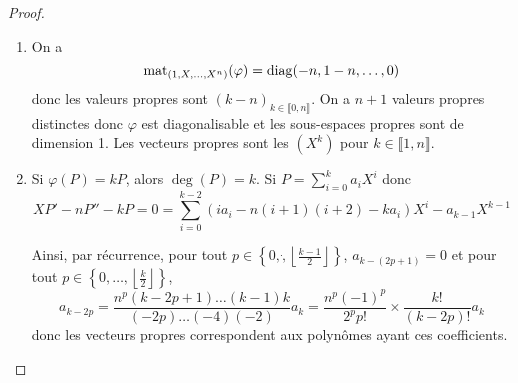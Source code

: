 \documentclass[12pt]{article}
\begin{document}
\begin{proof}
	\phantom{}
	\begin{enumerate}
		\item On a 
		\begin{equation}
			\operatorname{mat}_{(1,X,\dots,X^{n})}(\varphi)=\operatorname{diag}(-n,1-n,\dots,0)
		\end{equation}
		donc les valeurs propres sont $(k-n)_{k\in\llbracket0,n\rrbracket}$. On a $n+1$ valeurs propres distinctes donc $\varphi$ est diagonalisable et les sous-espaces propres sont de dimension 1. Les vecteurs propres sont les $(X^{k})$ pour $k\in\llbracket1,n\rrbracket$.

		\item Si $\varphi(P)=kP$, alors $\deg(P)=k$. Si $P=\sum_{i=0}^{k}a_{i}X^{i}$ donc 
		\begin{equation}
			XP'-nP''-kP=0=\sum_{i=0}^{k-2}\left(ia_{i}-n(i+1)(i+2)-ka_{i}\right)X^{i}-a_{k-1}X^{k-1}
		\end{equation}

		Ainsi, par récurrence, pour tout $p\in\left\lbrace0,\dot,\left\lfloor\frac{k-1}{2}\right\rfloor\right\rbrace$, $a_{k-(2p+1)}=0$ et pour tout $p\in\left\lbrace0,\dots,\left\lfloor\frac{k}{2}\right\rfloor\right\rbrace$,
		\begin{equation}
			a_{k-2p}=\frac{n^{p}(k-2p+1)\dots(k-1)k}{(-2p)\dots(-4)(-2)}a_{k}=\frac{n^{p}(-1)^{p}}{2^{p}p!}\times \frac{k!}{(k-2p)!}a_{k}
		\end{equation}
		donc les vecteurs propres correspondent aux polynômes ayant ces coefficients.
	\end{enumerate}
\end{proof}
\end{document}
